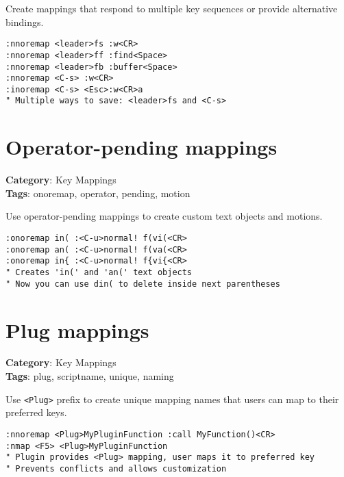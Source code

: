 Create mappings that respond to multiple key sequences or provide alternative bindings.

\begin{Exa*}{}
\begin{Verbatim}[fontsize=\footnotesize, breaklines, breakanywhere]
:nnoremap <leader>fs :w<CR>
:nnoremap <leader>ff :find<Space>
:nnoremap <leader>fb :buffer<Space>
:nnoremap <C-s> :w<CR>
:inoremap <C-s> <Esc>:w<CR>a
" Multiple ways to save: <leader>fs and <C-s>
\end{Verbatim}
\end{Exa*}

\section{Operator-pending mappings}

\textbf{Category}: Key Mappings\\ \textbf{Tags}: onoremap, operator, pending, motion
\vspace{0.5cm}

Use operator-pending mappings to create custom text objects and motions.

\begin{Exa*}{}
\begin{Verbatim}[fontsize=\footnotesize, breaklines, breakanywhere]
:onoremap in( :<C-u>normal! f(vi(<CR>
:onoremap an( :<C-u>normal! f(va(<CR>
:onoremap in{ :<C-u>normal! f{vi{<CR>
" Creates 'in(' and 'an(' text objects
" Now you can use din( to delete inside next parentheses
\end{Verbatim}
\end{Exa*}

\section{Plug mappings}

\textbf{Category}: Key Mappings\\ \textbf{Tags}: plug, scriptname, unique, naming
\vspace{0.5cm}

Use {\footnotesize \Verb§<Plug>§} prefix to create unique mapping names that users can map to their preferred keys.

\begin{Exa*}{}
\begin{Verbatim}[fontsize=\footnotesize, breaklines, breakanywhere]
:nnoremap <Plug>MyPluginFunction :call MyFunction()<CR>
:nmap <F5> <Plug>MyPluginFunction
" Plugin provides <Plug> mapping, user maps it to preferred key
" Prevents conflicts and allows customization
\end{Verbatim}
\end{Exa*}

